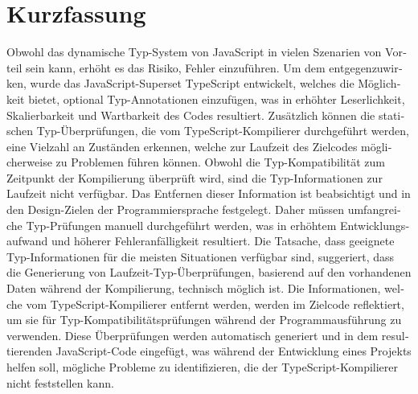 \chapter{Kurzfassung}

\begin{german}
Obwohl das dynamische Typ-System von JavaScript in vielen Szenarien von Vorteil sein kann, erhöht es das Risiko, Fehler einzuführen. Um dem entgegenzuwirken, wurde das JavaScript-Superset TypeScript entwickelt, welches die Möglichkeit bietet, optional Typ-Annotationen einzufügen, was in erhöhter Leserlichkeit, Skalierbarkeit und Wartbarkeit des Codes resultiert. Zusätzlich können die statischen Typ-Überprüfungen, die vom TypeScript-Kompilierer durchgeführt werden, eine Vielzahl an Zuständen erkennen, welche zur Laufzeit des Zielcodes möglicherweise zu Problemen führen können. Obwohl die Typ-Kompatibilität zum Zeitpunkt der Kompilierung überprüft wird, sind die Typ-Informationen zur Laufzeit nicht verfügbar. Das Entfernen dieser Information ist beabsichtigt und in den Design-Zielen der Programmiersprache festgelegt. Daher müssen umfangreiche Typ-Prüfungen manuell durchgeführt werden, was in erhöhtem Entwicklungsaufwand und höherer Fehleranfälligkeit resultiert. Die Tatsache, dass geeignete Typ-Informationen für die meisten Situationen verfügbar sind, suggeriert, dass die Generierung von Laufzeit-Typ-Überprüfungen, basierend auf den vorhandenen Daten während der Kompilierung, technisch möglich ist. Die Informationen, welche vom TypeScript-Kompilierer entfernt werden, werden im Zielcode reflektiert, um sie für Typ-Kompatibilitätsprüfungen während der Programmausführung zu verwenden. Diese Überprüfungen werden automatisch generiert und in dem resultierenden JavaScript-Code eingefügt, was während der Entwicklung eines Projekts helfen soll, mögliche Probleme zu identifizieren, die der TypeScript-Kompilierer nicht feststellen kann.
\end{german}
